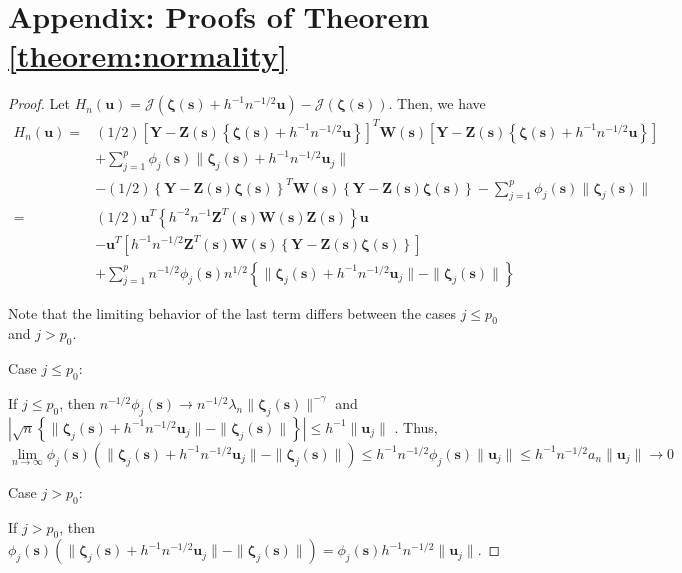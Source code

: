 \documentclass[authoryear,review, 12pt]{elsarticle}
\begin{document}
\appendix

\section*{Appendix: Proofs of Theorem \ref{theorem:normality}\label{sec:gaussian-normality-proof} }
\begin{proof}
Let $H_{n}(\bm{u})=\mathcal{J}\left(\bm{\zeta}\left(\bm{s}\right)+h^{-1}n^{-1/2}\bm{u}\right)-\mathcal{J}\left(\bm{\zeta}\left(\bm{s}\right)\right)$.
Then, we have 
\begin{align}
H_{n}\left(\bm{u}\right)= & (1/2)\left[\bm{Y}-\bm{Z}(\bm{s})\left\{ \bm{\zeta}\left(\bm{s}\right)+h^{-1}n^{-1/2}\bm{u}\right\} \right]^{T}\bm{W}(\bm{s})\left[\bm{Y}-\bm{Z}(\bm{s})\left\{ \bm{\zeta}\left(\bm{s}\right)+h^{-1}n^{-1/2}\bm{u}\right\} \right]\\
 & +\sum_{j=1}^{p}\phi_{j}(\bm{s})\|\bm{\zeta}_{j}(\bm{s})+h^{-1}n^{-1/2}\bm{u}_{j}\|\\
 & -(1/2)\left\{ \bm{Y}-\bm{Z}(\bm{s})\bm{\zeta}(\bm{s})\right\} ^{T}\bm{W}(\bm{s})\left\{ \bm{Y}-\bm{Z}(\bm{s})\bm{\zeta}(\bm{s})\right\} -\sum_{j=1}^{p}\phi_{j}(\bm{s})\|\bm{\zeta}_{j}(\bm{s})\|\\
= & (1/2)\bm{u}^{T}\left\{ h^{-2}n^{-1}\bm{Z}^{T}(\bm{s})\bm{W}(\bm{s})\bm{Z}(\bm{s})\right\} \bm{u}\\
 & -\bm{u}^{T}\left[h^{-1}n^{-1/2}\bm{Z}^{T}(\bm{s})\bm{W}(\bm{s})\left\{ \bm{Y}-\bm{Z}(\bm{s})\bm{\zeta}(\bm{s})\right\} \right]\\
 & +\sum_{j=1}^{p}n^{-1/2}\phi_{j}(\bm{s})n^{1/2}\left\{ \|\bm{\zeta}_{j}(\bm{s})+h^{-1}n^{-1/2}\bm{u}_{j}\|-\|\bm{\zeta}_{j}(\bm{s})\|\right\} 
\end{align}


Note that the limiting behavior of the last term differs between the
cases $j\le p_{0}$ and $j>p_{0}$.

Case $j\le p_{0}$:

If $j\le p_{0}$, then $n^{-1/2}\phi_{j}(\bm{s})\to n^{-1/2}\lambda_{n}\|\bm{\zeta}_{j}(\bm{s})\|^{-\gamma}$
and $|\sqrt{n}\left\{ \|\bm{\zeta}_{j}(\bm{s})+h^{-1}n^{-1/2}\bm{u}_{j}\|-\|\bm{\zeta}_{j}(\bm{s})\|\right\} |\le h^{-1}\|\bm{u}_{j}\|$
. Thus, 
\[
\lim\limits _{n\to\infty}\phi_{j}(\bm{s})\left(\|\bm{\zeta}_{j}(\bm{s})+h^{-1}n^{-1/2}\bm{u}_{j}\|-\|\bm{\zeta}_{j}(\bm{s})\|\right)\le h^{-1}n^{-1/2}\phi_{j}(\bm{s})\|\bm{u}_{j}\|\le h^{-1}n^{-1/2}a_{n}\|\bm{u}_{j}\|\to0
\]


Case $j>p_{0}$:

If $j>p_{0}$, then $\phi_{j}(\bm{s})\left(\|\bm{\zeta}_{j}(\bm{s})+h^{-1}n^{-1/2}\bm{u}_{j}\|-\|\bm{\zeta}_{j}(\bm{s})\|\right)=\phi_{j}(\bm{s})h^{-1}n^{-1/2}\|\bm{u}_{j}\|$.


\end{proof}
\end{document}
